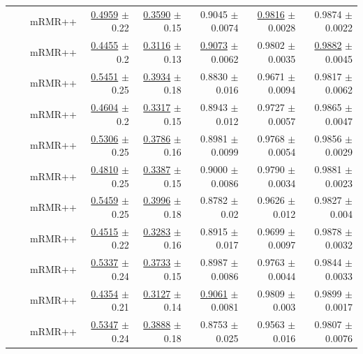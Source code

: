 \begin{longtable}{llp{}rrrrr}
 &  & mRMR++ & \underline{0.4959} {\scriptsize $\pm$ 0.22} & \underline{0.3590} {\scriptsize $\pm$ 0.15} & 0.9045 {\scriptsize $\pm$ 0.0074} & \underline{0.9816} {\scriptsize $\pm$ 0.0028} & 0.9874 {\scriptsize $\pm$ 0.0022} \\
 &  & mRMR++ & \underline{0.4455} {\scriptsize $\pm$ 0.2} & \underline{0.3116} {\scriptsize $\pm$ 0.13} & \underline{0.9073} {\scriptsize $\pm$ 0.0062} & 0.9802 {\scriptsize $\pm$ 0.0035} & \underline{0.9882} {\scriptsize $\pm$ 0.0045} \\
 &  & mRMR++ & \underline{0.5451} {\scriptsize $\pm$ 0.25} & \underline{0.3934} {\scriptsize $\pm$ 0.18} & 0.8830 {\scriptsize $\pm$ 0.016} & 0.9671 {\scriptsize $\pm$ 0.0094} & 0.9817 {\scriptsize $\pm$ 0.0062} \\
 &  & mRMR++ & \underline{0.4604} {\scriptsize $\pm$ 0.2} & \underline{0.3317} {\scriptsize $\pm$ 0.15} & 0.8943 {\scriptsize $\pm$ 0.012} & 0.9727 {\scriptsize $\pm$ 0.0057} & 0.9865 {\scriptsize $\pm$ 0.0047} \\
 &  & mRMR++ & \underline{0.5306} {\scriptsize $\pm$ 0.25} & \underline{0.3786} {\scriptsize $\pm$ 0.16} & 0.8981 {\scriptsize $\pm$ 0.0099} & 0.9768 {\scriptsize $\pm$ 0.0054} & 0.9856 {\scriptsize $\pm$ 0.0029} \\
 &  & mRMR++ & \underline{0.4810} {\scriptsize $\pm$ 0.25} & \underline{0.3387} {\scriptsize $\pm$ 0.15} & 0.9000 {\scriptsize $\pm$ 0.0086} & 0.9790 {\scriptsize $\pm$ 0.0034} & 0.9881 {\scriptsize $\pm$ 0.0023} \\
 &  & mRMR++ & \underline{0.5459} {\scriptsize $\pm$ 0.25} & \underline{0.3996} {\scriptsize $\pm$ 0.18} & 0.8782 {\scriptsize $\pm$ 0.02} & 0.9626 {\scriptsize $\pm$ 0.012} & 0.9827 {\scriptsize $\pm$ 0.004} \\
 &  & mRMR++ & \underline{0.4515} {\scriptsize $\pm$ 0.22} & \underline{0.3283} {\scriptsize $\pm$ 0.16} & 0.8915 {\scriptsize $\pm$ 0.017} & 0.9699 {\scriptsize $\pm$ 0.0097} & 0.9878 {\scriptsize $\pm$ 0.0032} \\
 &  & mRMR++ & \underline{0.5337} {\scriptsize $\pm$ 0.24} & \underline{0.3733} {\scriptsize $\pm$ 0.15} & 0.8987 {\scriptsize $\pm$ 0.0086} & 0.9763 {\scriptsize $\pm$ 0.0044} & 0.9844 {\scriptsize $\pm$ 0.0033} \\
 &  & mRMR++ & \underline{0.4354} {\scriptsize $\pm$ 0.21} & \underline{0.3127} {\scriptsize $\pm$ 0.14} & \underline{0.9061} {\scriptsize $\pm$ 0.0081} & 0.9809 {\scriptsize $\pm$ 0.003} & 0.9899 {\scriptsize $\pm$ 0.0017} \\
 &  & mRMR++ & \underline{0.5347} {\scriptsize $\pm$ 0.24} & \underline{0.3888} {\scriptsize $\pm$ 0.18} & 0.8753 {\scriptsize $\pm$ 0.025} & 0.9563 {\scriptsize $\pm$ 0.016} & 0.9807 {\scriptsize $\pm$ 0.0076} \\

\end{longtable}
